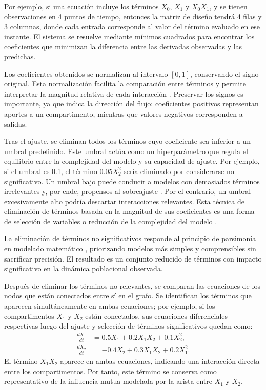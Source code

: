 Por ejemplo, si una ecuación incluye los términos \(X_0\), \(X_1\) y \(X_0 X_1\), y se tienen observaciones en 4 puntos de tiempo, entonces la matriz de diseño 
tendrá 4 filas y 3 columnas, donde cada entrada corresponde al valor del término evaluado en ese instante. El sistema se resuelve mediante mínimos cuadrados para 
encontrar los coeficientes que minimizan la diferencia entre las derivadas observadas y las predichas.

Los coeficientes obtenidos se normalizan al intervalo \([0, 1]\), conservando el signo original. Esta normalización facilita la comparación entre términos 
y permite interpretar la magnitud relativa de cada interacción \cite{Bishop2006, Hastie2009}.  Preservar los signos es importante, ya que indica la dirección del 
flujo: coeficientes positivos representan aportes a un compartimento, mientras que valores negativos corresponden a salidas.

Tras el ajuste, se eliminan todos los términos cuyo coeficiente sea inferior a un umbral predefinido. Este umbral actúa como un hiperparámetro que regula el equilibrio 
entre la complejidad del modelo y su capacidad de ajuste. Por ejemplo, si el umbral es 0.1, el término $0.05 X_2^2$ sería eliminado por considerarse no significativo. 
Un umbral bajo puede conducir a modelos con demasiados términos irrelevantes y, por ende, propensos al sobreajuste \cite{Hastie2009}. Por el contrario, un umbral 
excesivamente alto podría descartar interacciones relevantes.  Esta técnica de eliminación de términos basada en la magnitud de sus coeficientes es una forma de 
selección de variables o reducción de la complejidad del modelo \cite{Billings2013, Hastie2009}.

La eliminación de t\'erminos no significativos responde al principio de parsimonia en modelado matemático \cite{Burnham2002, Box1976}, priorizando modelos más simples 
y comprensibles sin sacrificar precisión. El resultado es un conjunto reducido de términos con impacto significativo en la dinámica poblacional observada.

Después de eliminar los términos no relevantes, se comparan las ecuaciones de los nodos que están conectados entre sí en el grafo. Se identifican los términos que 
aparecen simultáneamente en ambas ecuaciones; por ejemplo, si los compartimentos \(X_1\) y \(X_2\) están conectados, sus ecuaciones diferenciales respectivas luego 
del ajuste y selección de términos significativos quedan como:
\begin{align*}
\frac{dX_1}{dt} &= 0.5 X_1 + 0.2 X_1 X_2 + 0.1 X_2^2, \\
\frac{dX_2}{dt} &= -0.4 X_2 + 0.3 X_1 X_2 + 0.2 X_1^2.
\end{align*}
El término \(X_1 X_2\) aparece en ambas ecuaciones, indicando una interacción directa entre los compartimentos. Por tanto, este término 
se conserva como representativo de la influencia mutua modelada por la arista entre \(X_1\) y \(X_2\).

